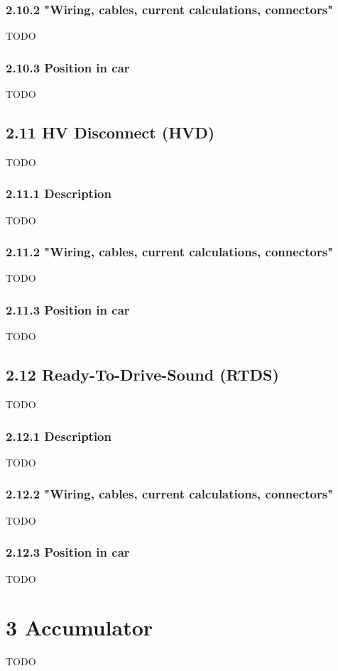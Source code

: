 \documentclass{article}
\begin{document}
\subsubsection*{2.10.2 "Wiring, cables, current calculations, connectors"}
TODO

\subsubsection*{2.10.3 Position in car}
TODO

\subsection*{2.11 HV Disconnect (HVD)}
TODO

\subsubsection*{2.11.1 Description}
TODO

\subsubsection*{2.11.2 "Wiring, cables, current calculations, connectors"}
TODO

\subsubsection*{2.11.3 Position in car}
TODO

\subsection*{2.12 Ready-To-Drive-Sound (RTDS)}
TODO

\subsubsection*{2.12.1 Description}
TODO

\subsubsection*{2.12.2 "Wiring, cables, current calculations, connectors"}
TODO

\subsubsection*{2.12.3 Position in car}
TODO

\section*{3 Accumulator}
TODO
\end{document}
